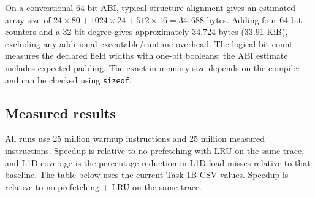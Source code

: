 On a conventional 64-bit ABI, typical structure alignment gives an estimated array size of $24\times80 + 1024\times24 + 512\times16 = 34,688$ bytes. Adding four 64-bit counters and a 32-bit degree gives approximately 34,724 bytes (33.91 KiB), excluding any additional executable/runtime overhead. The logical bit count measures the declared field widths with one-bit booleans; the ABI estimate includes expected padding. The exact in-memory size depends on the compiler and can be checked using \texttt{sizeof}.

\subsection{Measured results}

All runs use 25 million warmup instructions and 25 million measured instructions. Speedup is relative to no prefetching with LRU on the same trace, and L1D coverage is the percentage reduction in L1D load misses relative to that baseline. The table below uses the current Task 1B CSV values. Speedup is relative to no prefetching + LRU on the same trace.

\begin{table}[H]\centering\scriptsize
\caption{Task 1B results from the current CSV. Accuracy and coverage are not applicable to the no-prefetch baseline.}
\end{table}

